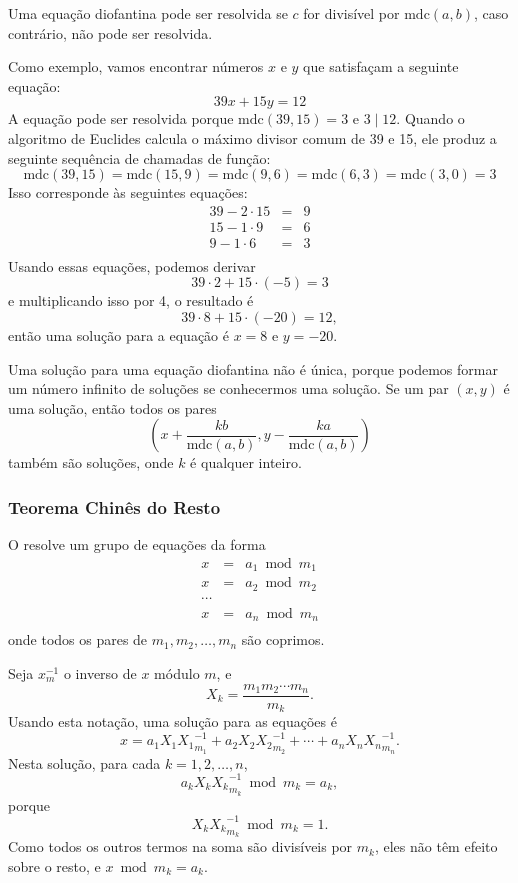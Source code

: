 Uma equação diofantina pode ser resolvida se $c$ for divisível por $\textrm{mdc}(a,b)$, caso contrário, não pode ser resolvida.

Como exemplo, vamos encontrar números $x$ e $y$ que satisfaçam a seguinte equação:
\[
39x + 15y = 12
\]
A equação pode ser resolvida porque $\textrm{mdc}(39,15)=3$ e $3 \mid 12$. Quando o algoritmo de Euclides calcula o máximo divisor comum de 39 e 15, ele produz a seguinte sequência de chamadas de função:
\[
\textrm{mdc}(39,15) = \textrm{mdc}(15,9)
= \textrm{mdc}(9,6) = \textrm{mdc}(6,3)
= \textrm{mdc}(3,0) = 3 \]
Isso corresponde às seguintes equações:
\[
\begin{array}{lcl}
39 - 2 \cdot 15 & = & 9 \\
15 - 1 \cdot 9 & = & 6 \\
9 - 1 \cdot 6 & = & 3 \\
\end{array}
\]
Usando essas equações, podemos derivar
\[
39 \cdot 2 + 15 \cdot (-5) = 3
\]
e multiplicando isso por 4, o resultado é
\[
39 \cdot 8 + 15 \cdot (-20) = 12,
\]
então uma solução para a equação é $x=8$ e $y=-20$.

Uma solução para uma equação diofantina não é única, porque podemos formar um número infinito de soluções se conhecermos uma solução. Se um par $(x,y)$ é uma solução, então todos os pares
\[(x+\frac{kb}{\textrm{mdc}(a,b)},y-\frac{ka}{\textrm{mdc}(a,b)})\]
também são soluções, onde $k$ é qualquer inteiro.

\subsubsection{Teorema Chinês do Resto}


O  resolve um grupo de equações da forma
\[
\begin{array}{lcl}
x & = & a_1 \bmod m_1 \\
x & = & a_2 \bmod m_2 \\
\cdots \\
x & = & a_n \bmod m_n \\
\end{array}
\]
onde todos os pares de $m_1,m_2,\ldots,m_n$ são coprimos.

Seja $x^{-1}_m$ o inverso de $x$ módulo $m$, e
\[ X_k = \frac{m_1 m_2 \cdots m_n}{m_k}.\]
Usando esta notação, uma solução para as equações é
\[x = a_1 X_1 {X_1}^{-1}_{m_1} + a_2 X_2 {X_2}^{-1}_{m_2} + \cdots + a_n X_n {X_n}^{-1}_{m_n}.\]
Nesta solução, para cada $k=1,2,\ldots,n$,
\[a_k X_k {X_k}^{-1}_{m_k} \bmod m_k = a_k,\]
porque
\[X_k {X_k}^{-1}_{m_k} \bmod m_k = 1.\]
Como todos os outros termos na soma são divisíveis por $m_k$, eles não têm efeito sobre o resto, e $x \bmod m_k = a_k$.


